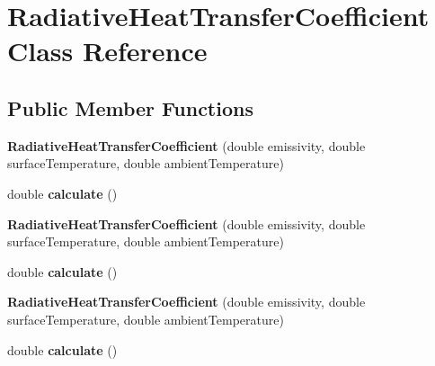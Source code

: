 \hypertarget{class_radiative_heat_transfer_coefficient}{}\section{Radiative\+Heat\+Transfer\+Coefficient Class Reference}
\label{class_radiative_heat_transfer_coefficient}
\subsection*{Public Member Functions}
\begin{DoxyCompactItemize}
\item 
\mbox{\label{class_radiative_heat_transfer_coefficient_abc24da1bf1427f01e250bd60c859f0cb}} 
{\bfseries Radiative\+Heat\+Transfer\+Coefficient} (double emissivity, double surface\+Temperature, double ambient\+Temperature)
\item 
\mbox{\label{class_radiative_heat_transfer_coefficient_aae61120a1161de9ae7a17ea1c8761e0f}} 
double {\bfseries calculate} ()
\item 
\mbox{\label{class_radiative_heat_transfer_coefficient_abc24da1bf1427f01e250bd60c859f0cb}} 
{\bfseries Radiative\+Heat\+Transfer\+Coefficient} (double emissivity, double surface\+Temperature, double ambient\+Temperature)
\item 
\mbox{\label{class_radiative_heat_transfer_coefficient_aae61120a1161de9ae7a17ea1c8761e0f}} 
double {\bfseries calculate} ()
\item 
\mbox{\label{class_radiative_heat_transfer_coefficient_abc24da1bf1427f01e250bd60c859f0cb}} 
{\bfseries Radiative\+Heat\+Transfer\+Coefficient} (double emissivity, double surface\+Temperature, double ambient\+Temperature)
\item 
\mbox{\label{class_radiative_heat_transfer_coefficient_aae61120a1161de9ae7a17ea1c8761e0f}} 
double {\bfseries calculate} ()
\end{DoxyCompactItemize}


